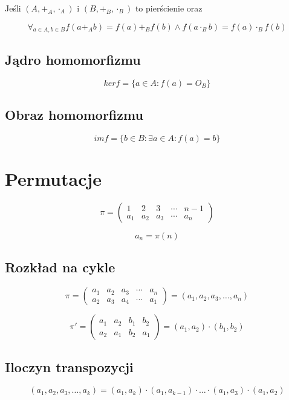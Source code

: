 \documentclass{../notatki}
\begin{document}
Jeśli $(A, +_A, \cdot_A)$ i $(B, +_B, \cdot_B)$ to pierścienie oraz

$$
\forall_{a \in A, b \in B} f(a +_A b) = f(a) +_B f(b) \wedge f(a
\cdot_B b) = f(a) \cdot_B f(b)
$$

\subsection{Jądro homomorfizmu}

$$
ker f = \{a \in A: f(a) = O_B\}
$$

\subsection{Obraz homomorfizmu}

$$
im f = \{b \in B: \exists a \in A: f(a) = b\}
$$

\section{Permutacje}

$$
\pi =
\begin{pmatrix}
  1   & 2   & 3   & \cdots & n-1   \\
  a_1 & a_2 & a_3 & \cdots &  a_n
\end{pmatrix}
$$

$$
a_n = \pi(n)
$$

\subsection{Rozkład na cykle}

$$
\pi =
\begin{pmatrix}
  a_1 & a_2 & a_3 & \cdots & a_n   \\
  a_2 & a_3 & a_4 & \cdots & a_1
\end{pmatrix}
= (a_1, a_2, a_3, \dots, a_n)
$$

$$
\pi' =
\begin{pmatrix}
  a_1 & a_2 & b_1 & b_2   \\
  a_2 & a_1 & b_2 & a_1
\end{pmatrix}
= (a_1, a_2) \cdot (b_1, b_2)
$$

\subsection{Iloczyn transpozycji}

$$
(a_1, a_2, a_3, \dots, a_k) = (a_1, a_k) \cdot (a_1, a_{k-1}) \cdot
\dots \cdot (a_1, a_3) \cdot (a_1, a_2)
$$
\end{document}
